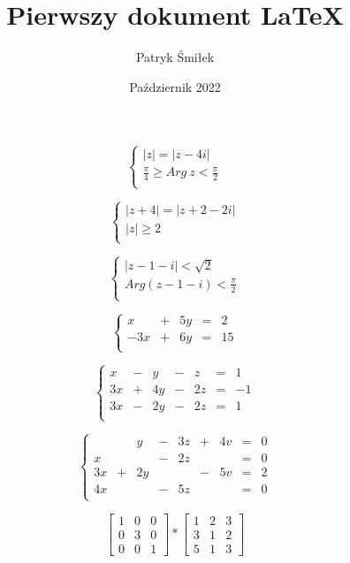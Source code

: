 \documentclass[12pt, letterpaper, titlepage]{article}
\title{Pierwszy dokument LaTeX}
\author{Patryk Śmiłek}
\date{Październik 2022}
\begin{document}
\maketitle
$$
\begin{cases}
|z|=|z-4i|\\
\frac{\pi}{4} \geq Arg \ z < \frac{\pi}{2} \\
\end{cases}
$$

$$
\begin{cases}
|z+4|=|z+2-2i| \\
|z| \geq 2 \\
\end{cases}
$$

$$
\begin{cases}
|z-1-i| < \sqrt{2} \\
Arg(z-1-i) < \frac{\pi}{2}\\
\end{cases}
$$

$$
\left\{
\begin{array}{rrrrr}
x & + & 5y & = & 2 \\
-3x & + & 6y & = & 15 \\
\end{array}
\right.$$

$$
\left\{
\begin{array}{rrrrrrr}
x & - & y & - & z & = & 1 \\
3x & + & 4y & - & 2z & = & -1 \\
3x & - & 2y & - & 2z & = & 1 \\
\end{array}
\right.$$

$$
\left\{
\begin{array}{rrrrrrrrr}
& & y & - & 3z & + & 4v & = & 0 \\
x & & & - & 2z & & &  = & 0 \\
3x & + & 2y & & & - & 5v & = & 2\\
4x & & & - & 5z & & & = & 0 \\
\end{array}
\right.$$

$$
\left[
\begin{array}{ccc}
1 & 0 & 0 \\
0 & 3 & 0 \\
0 & 0 & 1 
\end{array}
\right]
*
\left[
\begin{array}{ccc}
1 & 2 & 3 \\
3 & 1 & 2 \\
5 & 1 & 3 
\end{array} 
\right]$$
\end{document}
